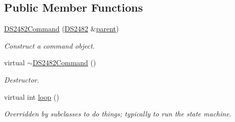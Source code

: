 \subsection*{Public Member Functions}
\begin{DoxyCompactItemize}
\item 
\mbox{\hyperlink{class_d_s2482_command_afafdd341bb8dbddf755a1ba2aaee79db}{D\+S2482\+Command}} (\mbox{\hyperlink{class_d_s2482}{D\+S2482}} \&\mbox{\hyperlink{class_d_s2482_command_a54a41fb8a610ef2077f5e5377771aaf3}{parent}})
\begin{DoxyCompactList}\small\item\em Construct a command object. \end{DoxyCompactList}\item 
\mbox{\label{class_d_s2482_command_abc7ef041a3124b81183a9e37ab29b5bd}} 
virtual \mbox{\hyperlink{class_d_s2482_command_abc7ef041a3124b81183a9e37ab29b5bd}{$\sim$\+D\+S2482\+Command}} ()
\begin{DoxyCompactList}\small\item\em Destructor. \end{DoxyCompactList}\item 
\mbox{\label{class_d_s2482_command_a21cf2a349a6f7089ef2e099d83993b15}} 
virtual int \mbox{\hyperlink{class_d_s2482_command_a21cf2a349a6f7089ef2e099d83993b15}{loop}} ()
\begin{DoxyCompactList}\small\item\em Overridden by subclasses to do things; typically to run the state machine. \end{DoxyCompactList}\end{DoxyCompactItemize}
